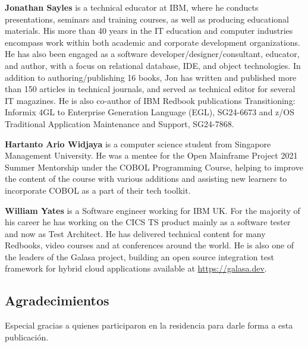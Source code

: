 \textbf{Jonathan Sayles} is a technical educator at IBM, where he
conducts presentations, seminars and training courses, as well as
producing educational materials. His more than 40 years in the IT
education and computer industries encompass work within both academic
and corporate development organizations. He has also been engaged as a
software developer/designer/consultant, educator, and author, with a
focus on relational database, IDE, and object technologies. In addition
to authoring/publishing 16 books, Jon has written and published more
than 150 articles in technical journals, and served as technical editor
for several IT magazines. He is also co-author of IBM Redbook
publications Transitioning: Informix 4GL to Enterprise Generation
Language (EGL), SG24-6673 and z/OS Traditional Application Maintenance
and Support, SG24-7868.

\textbf{Hartanto Ario Widjaya} is a computer science student from 
Singapore Management University. He was a mentee for the Open Mainframe 
Project 2021 Summer Mentorship under the COBOL Programming Course, 
helping to improve the content of the course with various additions and 
assisting new learners to incorporate COBOL as a part of their tech 
toolkit.

\textbf{William Yates} is a Software engineer working for IBM UK. For
the majority of his career he has working on the CICS TS product mainly
as a software tester and now as Test Architect. He has delivered
technical content for many Redbooks, video courses and at conferences
around the world. He is also one of the leaders of the Galasa project,
building an open source integration test framework for hybrid cloud
applications available at \href{https://galasa.dev/}{https://galasa.dev}.

\hypertarget{acknowledgements}{%
\subsection*{Agradecimientos}\label{acknowledgements}}

Especial gracias a quienes participaron en la residencia para darle forma a esta publicación.

